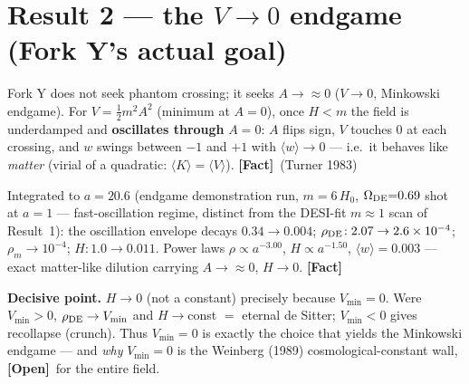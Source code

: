 \documentclass[11pt]{article}
\newcommand{\Fact}{\textbf{\textcolor{green!45!black}{[Fact]}}}
\newcommand{\Open}{\textbf{\textcolor{gray!10!black}{[Open]}}}
\begin{document}
\section{Result 2 --- the $V\to0$ endgame (Fork Y's actual goal)}
Fork Y does not seek phantom crossing; it seeks $A\to\approx0$ ($V\to0$, Minkowski endgame). For $V=\tfrac12 m^2A^2$ (minimum at $A=0$), once $H<m$ the field is underdamped and \textbf{oscillates through} $A=0$: $A$ flips sign, $V$ touches $0$ at each crossing, and $w$ swings between $-1$ and $+1$ with $\langle w\rangle\to0$ --- i.e.\ it behaves like \emph{matter} (virial of a quadratic: $\langle K\rangle=\langle V\rangle$). \Fact\ (Turner 1983)

Integrated to $a=20.6$ (endgame demonstration run, $m=6\,H_0$, $\Omega_{\rm DE}{=}0.69$ shot at $a{=}1$ --- fast-oscillation regime, distinct from the DESI-fit $m\!\approx\!1$ scan of Result~1): the oscillation envelope decays $0.34\to0.004$; $\rho_{\rm DE}\!:2.07\to2.6\times10^{-4}$; $\rho_m\to10^{-4}$; $H\!:1.0\to0.011$. Power laws $\rho\propto a^{-3.00}$, $H\propto a^{-1.50}$, $\langle w\rangle=0.003$ --- exact matter-like dilution carrying $A\to\approx0$, $H\to0$. \Fact

\textbf{Decisive point.} $H\to0$ (not a constant) precisely because $V_{\min}=0$. Were $V_{\min}>0$, $\rho_{\rm DE}\to V_{\min}$ and $H\to$const $=$ eternal de Sitter; $V_{\min}<0$ gives recollapse (crunch). Thus $V_{\min}=0$ is exactly the choice that yields the Minkowski endgame --- and \emph{why} $V_{\min}=0$ is the Weinberg (1989) cosmological-constant wall, \Open\ for the entire field.
\end{document}

